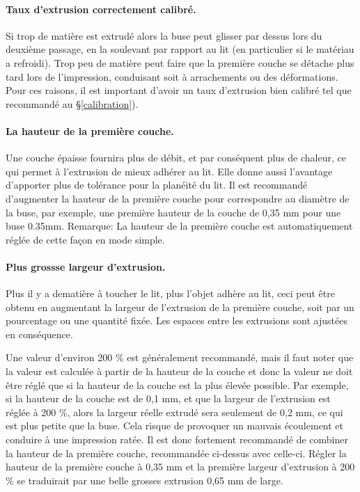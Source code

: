 \paragraph{Taux d'extrusion correctement calibré.} %
\label{par:correct_extrusion_settings}
Si trop de matière est extrudé alors la buse peut glisser par dessus lors du deuxième passage, en la soulevant par rapport au lit (en particulier si le matériau a refroidi). Trop peu de matière peut faire que la première couche se détache plus tard lors de l'impression, conduisant soit à arrachements ou des déformations. Pour ces raisons, il est important d'avoir un taux d'extrusion bien calibré tel que recommandé au §\ref{calibration}).

\paragraph{La hauteur de la première couche.} %
\label{par:first_layer_height}
Une couche épaisse fournira plus de débit, et par conséquent plus de chaleur, ce qui permet à l'extrusion de mieux adhérer au lit. Elle donne aussi l'avantage d'apporter plus de tolérance pour la planéité du lit. Il est recommandé d'augmenter la hauteur de la première couche pour correspondre au diamètre de la buse, par exemple, une première hauteur de la couche de 0,35 mm pour une buse 0.35mm.
Remarque: La hauteur de la première couche est automatiquement réglée de cette façon en mode simple.

\paragraph{Plus grossse largeur d'extrusion.} %
\label{par:wider_extrusion_width}
Plus il y a dematière à toucher le lit, plus l'objet adhère au lit, ceci peut être obtenu en augmentant la largeur de l'extrusion de la première couche, soit par un pourcentage ou une quantité fixée. Les espaces entre les extrusions sont ajustées en conséquence.

Une valeur d'environ 200 \% est généralement recommandé, mais il faut noter que la valeur est calculée à partir de la hauteur de la couche et donc la valeur ne doit être réglé que si la hauteur de la couche est la plus élevée possible. Par exemple, si la hauteur de la couche est de 0,1 mm, et que la largeur de l'extrusion est réglée à 200 \%, alors la largeur réelle extrudé sera seulement de 0,2 mm, ce qui est plus petite que la buse. Cela risque de provoquer un mauvais écoulement et conduire à une impression ratée. Il est donc fortement recommandé de combiner la hauteur de la première couche, recommandée ci-dessus avec celle-ci. Régler la hauteur de la première couche à 0,35 mm et la première largeur d'extrusion à 200 \% se traduirait par une belle grosses extrusion 0,65 mm de large.

